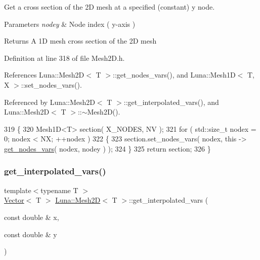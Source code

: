 Get a cross section of the 2D mesh at a specified (constant) y node. 


\begin{DoxyParams}{Parameters}
{\em nodey} & Node index ( y-\/axis ) \\
\hline
\end{DoxyParams}
\begin{DoxyReturn}{Returns}
A 1D mesh cross section of the 2D mesh 
\end{DoxyReturn}


Definition at line 318 of file Mesh2\+D.\+h.



References Luna\+::\+Mesh2\+D$<$ T $>$\+::get\+\_\+nodes\+\_\+vars(), and Luna\+::\+Mesh1\+D$<$ T, X $>$\+::set\+\_\+nodes\+\_\+vars().



Referenced by Luna\+::\+Mesh2\+D$<$ T $>$\+::get\+\_\+interpolated\+\_\+vars(), and Luna\+::\+Mesh2\+D$<$ T $>$\+::$\sim$\+Mesh2\+D().


\begin{DoxyCode}
319   \{
320     Mesh1D<T> section( X\_NODES, NV );
321     \textcolor{keywordflow}{for} ( std::size\_t nodex = 0; nodex < NX; ++nodex )
322     \{
323       section.set\_nodes\_vars( nodex, \textcolor{keyword}{this} -> \hyperlink{classLuna_1_1Mesh2D_ae91c7515960ecedf43e4ed3f411080a1}{get\_nodes\_vars}( nodex, nodey ) );
324     \}
325     \textcolor{keywordflow}{return} section;
326   \}
\end{DoxyCode}
\mbox{\label{classLuna_1_1Mesh2D_aac2ab4028e87cb380f7e23a81e5c5c6e}} 
\subsubsection{\texorpdfstring{get\+\_\+interpolated\+\_\+vars()}{get\_interpolated\_vars()}}
{\footnotesize\ttfamily template$<$typename T $>$ \\
\hyperlink{classLuna_1_1Vector}{Vector}$<$ T $>$ \hyperlink{classLuna_1_1Mesh2D}{Luna\+::\+Mesh2D}$<$ T $>$\+::get\+\_\+interpolated\+\_\+vars (\begin{DoxyParamCaption}\item[{const double \&}]{x,  }\item[{const double \&}]{y }\end{DoxyParamCaption})}



